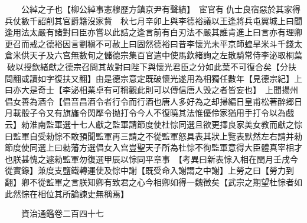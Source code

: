 　　公綽之子也【柳公綽事憲穆歷方鎮京尹有聲績】　宦官有仇士良宿惡於其家得兵仗數千詔削其官爵籍沒家貲　秋七月辛卯上與李德裕議以王逢將兵屯翼城上曰聞逢用法太嚴有諸對曰臣亦嘗以此詰之逢言前有白刃法不嚴其誰肯進上曰言亦有理卿更召而戒之德裕因言劉稹不可赦上曰固然德裕曰昔李懷光未平京師蝗旱米斗千錢太倉米供天子及六宫無數旬之儲德宗集百官遣中使馬欽緒詢之左散騎常侍李泌取桐葉破以授欽緒獻之德宗召問其故對曰陛下與懷光君臣之分如此葉不可復合矣【分扶問翻或讀如字復扶又翻】由是德宗意定既破懷光遂用為相獨任數年【見德宗紀】上曰亦大是奇士【李泌相業卓有可稱觀此則可以傳信唐人毁之者皆妄也】　上聞揚州倡女善為酒令【倡音昌酒令者行令而行酒也唐人多好為之却掃編日皇甫松著醉郷日月載骰子令又有旗旛令閃擪令抛打令今人不復曉其法惟優伶家猶用手打令以為戲云】勑淮南監軍選十七人獻之監軍請節度使杜悰同選且欲更擇良家美女教而獻之悰曰監軍自受勑悰不敢預聞監軍再三請之不從監軍怒具表其狀上覽表默然左右請并勑節度使同選上曰勑藩方選倡女入宫豈聖天子所為杜悰不徇監軍意得大臣體真宰相才也朕甚愧之遽勑監軍勿復選甲辰以悰同平章事　【考異曰新表悰入相在閏月壬戌今從實錄】兼度支鹽鐵轉運使及悰中謝【既受命入謝謂之中謝】上勞之曰【勞力到翻】卿不從監軍之言朕知卿有致君之心今相卿如得一魏徵矣【武宗之期望杜悰者如此然悰在相位其所論諫史無稱焉】

　　資治通鑑卷二百四十七


    


 


 



 

 
  







 


　　
　　
　
　
　


　　

　















	
	









































